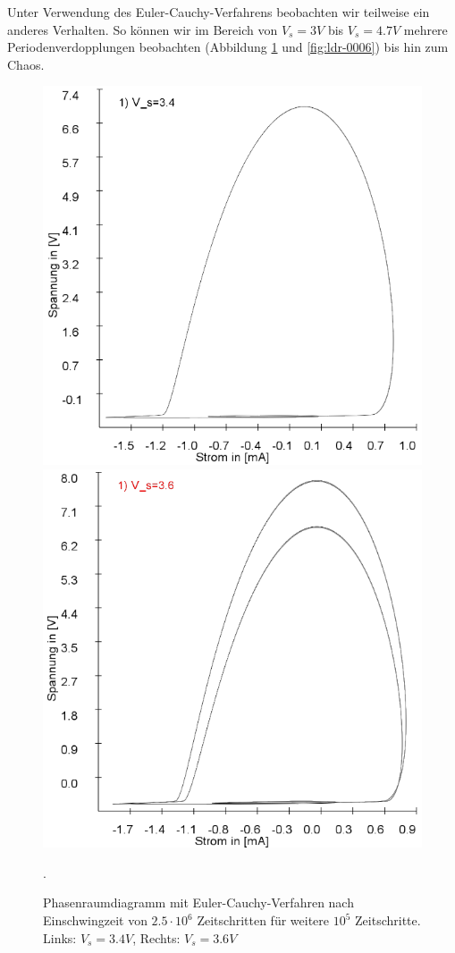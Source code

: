 \documentclass[12pt,a4paper]{article}
\begin{document}
Unter Verwendung des Euler-Cauchy-Verfahrens beobachten wir teilweise ein anderes Verhalten. So können wir im Bereich von $V_s=3V$ bis $V_s=4.7V$ mehrere Periodenverdopplungen beobachten (Abbildung \ref{fig:ldr-0005} und \ref{fig:ldr-0006}) bis hin zum Chaos.
\begin{figure}[!htbp]
\includegraphics[scale=0.42]{schwing-euler-nach2500k-weitere100k-3,4V}
\includegraphics[scale=0.42]{schwing-euler-nach2500k-weitere100k-3,6V}
\caption{Phasenraumdiagramm mit Euler-Cauchy-Verfahren nach Einschwingzeit von $2.5\cdot10^6$ Zeitschritten für weitere $10^5$ Zeitschritte. Links: $V_s=3.4V$, Rechts: $V_s=3.6V$}. 
\label{fig:ldr-0005}
\end{figure}
\end{document}
